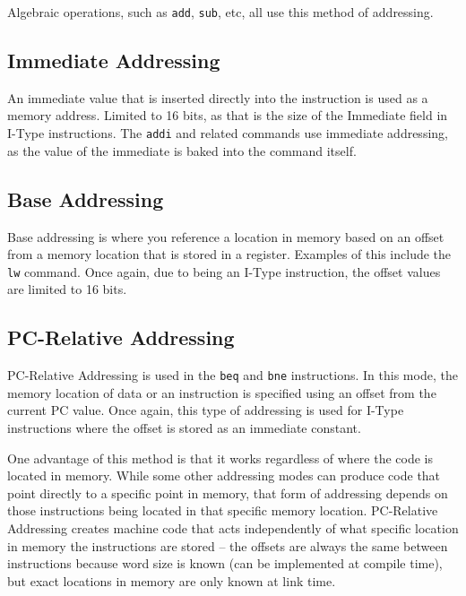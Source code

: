 \documentclass{article}
\begin{document}
Algebraic operations, such as \texttt{add}, \texttt{sub}, etc, all use this method of addressing. 


\subsection{Immediate Addressing}\label{Immediate Addressing}

An immediate value that is inserted directly into the instruction is used as a memory address. Limited to 16 bits, as that is the size of the Immediate field in I-Type instructions. The \texttt{addi} and related commands use immediate addressing, as the value of the immediate is baked into the command itself. 


\subsection{Base Addressing}\label{Base Addressing}

Base addressing is where you reference a location in memory based on an offset from a memory location that is stored in a register. Examples of this include the \texttt{lw} command. Once again, due to being an I-Type instruction, the offset values are limited to 16 bits. 


\subsection{PC-Relative Addressing}\label{PC-Relative Addressing}

PC-Relative Addressing is used in the \texttt{beq} and \texttt{bne} instructions. In this mode, the memory location of data or an instruction is specified using an offset from the current PC value. Once again, this type of addressing is used for I-Type instructions where the offset is stored as an immediate constant. 

One advantage of this method is that it works regardless of where the code is located in memory. While some other addressing modes can produce code that point directly to a specific point in memory, that form of addressing depends on those instructions being located in that specific memory location. PC-Relative Addressing creates machine code that acts independently of what specific location in memory the instructions are stored -- the offsets are always the same between instructions because word size is known (can be implemented at compile time), but exact locations in memory are only known at link time.
\end{document}

